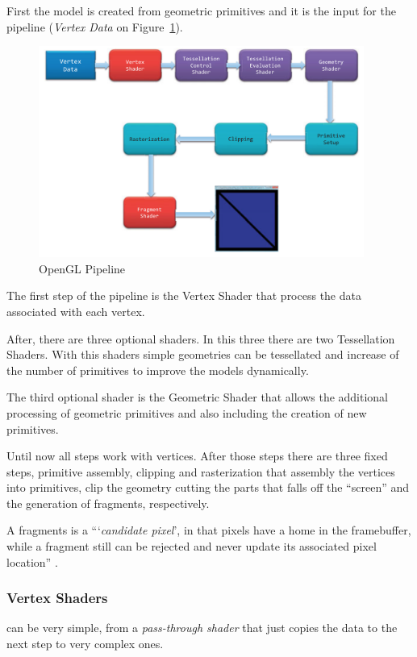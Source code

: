 First the model is created from geometric primitives and it is the input for the pipeline (\emph{Vertex Data} on Figure~\ref{fig:OGLPipeline}). 

\begin{figure}[htbp]
	\centering
	\includegraphics[width=0.95\textwidth]{img/OpenGL/pipeline.png}
	\caption{OpenGL Pipeline \cite{shreiner2013opengl}}
	\label{fig:OGLPipeline}
\end{figure}


The first step of the pipeline is the Vertex Shader that process the data associated with each vertex. 

After, there are three optional shaders. In this three there are two Tessellation Shaders. With this shaders simple geometries can be tessellated and increase of the number of primitives to improve the models dynamically.

The third optional shader is the Geometric Shader that allows the additional processing of geometric primitives and also including the creation of new primitives.

Until now all steps work with vertices. After those steps there are three fixed steps, primitive assembly, clipping and rasterization that assembly the vertices into primitives, clip the geometry cutting the parts that falls off the ``screen'' and the generation of fragments, respectively.

A fragments is a ``‘\emph{candidate pixel}’, in that pixels have a home in the framebuffer, while a fragment still can be rejected and never update its associated pixel location'' \cite{shreiner2013opengl}.

\subsubsection{Vertex Shaders} %
\label{sub:vertex_shaders}
can be very simple, from a \emph{pass-through shader} that just copies the data to the next step to very complex ones.

